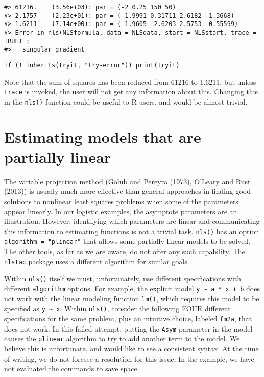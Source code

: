 \begin{verbatim}
#> 61216.    (3.56e+03): par = (-2 0.25 150 50)
#> 2.1757    (2.23e+01): par = (-1.9991 0.31711 2.6182 -1.3668)
#> 1.6211    (7.14e+00): par = (-1.9605 -2.6203 2.5753 -0.55599)
#> Error in nls(NLSformula, data = NLSdata, start = NLSstart, trace = TRUE) : 
#>   singular gradient
\end{verbatim}

\begin{verbatim}
if (! inherits(tryit, "try-error")) print(tryit)
\end{verbatim}

Note that the sum of squares has been reduced from 61216 to 1.6211, but
unless \texttt{trace} is invoked, the user will not get any information about this.
Changing this in the \texttt{nls()} function could be useful to R users, and would
be almost trivial.

\hypertarget{estimating-models-that-are-partially-linear}{%
\section{Estimating models that are partially linear}\label{estimating-models-that-are-partially-linear}}

The variable projection method (Golub and Pereyra (1973), O'Leary and Rust (2013)) is
usually much more effective than general approaches in finding good solutions
to nonlinear least squares
problems when some of the parameters appear linearly. In our logistic examples,
the asymptote parameters are an illustration. However, identifying which parameters
are linear and communicating this information to estimating functions
is not a trivial task. \texttt{nls()} has an option \texttt{algorithm\ =\ "plinear"} that allows some partially linear
models to be solved. The other tools, as far as we are aware, do not offer any
such capability. The \texttt{nlstac} package uses a different algorithm for similar goals.

Within \texttt{nls()} itself we must, unfortunately, use
different specifications with different \texttt{algorithm} options.
For example, the explicit model \texttt{y\ \textasciitilde{}\ a\ *\ x\ +\ b} does not work with the linear
modeling function \texttt{lm()}, which requires this model to be specified as \texttt{y\ \textasciitilde{}\ x}.
Within \texttt{nls()}, consider the following FOUR different specifications for the same
problem, plus an intuitive choice, labeled \texttt{fm2a}, that does not work.
In this failed attempt, putting the \texttt{Asym} parameter in the model causes the
\texttt{plinear} algorithm
to try to add another term to the model. We believe this is unfortunate, and would
like to see a consistent syntax. At the time of writing, we do
not foresee a resolution for this issue. In the example, we have not evaluated
the commands to save space.

